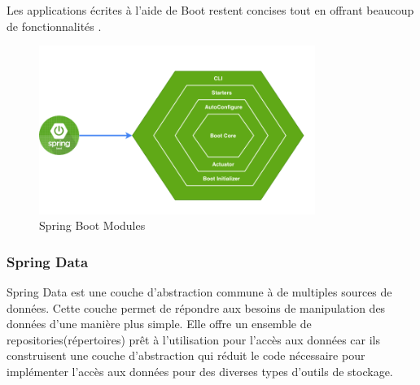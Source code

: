 Les applications \'ecrites \`a l'aide de Boot restent concises tout en offrant beaucoup de fonctionnalit\'es \cite{SpringBoot}.
\begin{figure}[!ht]\centering
\includegraphics[width=0.8\textwidth]{chapitres/chapitrex/figures/Spring-Boot-Modules.png}
\caption{Spring Boot Modules}
\label{fig:Spring-Boot-Modules}
\end{figure}
\subsubsection*{Spring Data}
Spring Data est une couche d'abstraction commune \`a de multiples sources de donn\'ees. Cette couche permet de r\'epondre aux besoins de manipulation des donn\'ees d'une mani\`ere plus simple. Elle offre un ensemble de repositories(r\'epertoires) pr\^et \`a l'utilisation pour l'acc\`es aux donn\'ees car ils construisent une couche d’abstraction qui r\'eduit le code n\'ecessaire pour impl\'ementer l'acc\`es aux donn\'ees pour des diverses types d'outils de stockage. 


